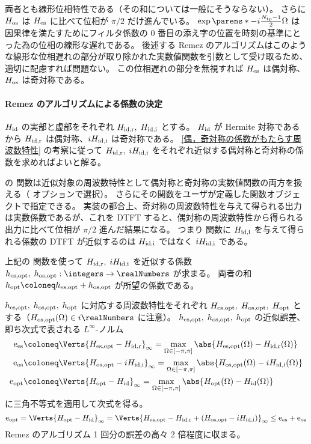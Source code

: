                 両者とも線形位相特性である（その和については一般にそうならない）。
                さらに $H_{\text{os}}$ は $H_{\text{es}}$ に比べて位相が $\pi/2$ だけ進んでいる。
                $\exp\parens*{-i\frac{\Ntp-1}{2}\Omega}$ は因果律を満たすためにフィルタ係数の 0 番目の添え字の位置を時刻の基準にとった為の位相の線形な遅れである。
                後述する Remez のアルゴリズムはこのような線形な位相遅れの部分が取り除かれた実数値関数を引数として受け取るため、適切に配慮すれば問題ない。
                この位相遅れの部分を無視すれば $H_{\text{es}}$ は偶対称、$H_{\text{os}}$ は奇対称である。
            \paragraph{Remez のアルゴリズムによる係数の決定}
                \label{Remez のアルゴリズムによる係数の決定}
                $H_{\text{id}}$ の実部と虚部をそれぞれ $H_{\text{id,r}},\;H_{\text{id,i}}$ とする。
                $H_{\text{id}}$ が Hermite 対称であるから $H_{\text{id,r}}$ は偶対称、$iH_{\text{id,i}}$ は奇対称である。
                \ref{偶，奇対称の係数がもたらす周波数特性} の考察に従って $H_{\text{id,r}},\;iH_{\text{id,i}}$ をそれぞれ近似する偶対称と奇対称の係数を求めればよいと解る。
                \par
                \cite{DSP_JL} の  関数は近似対象の周波数特性として偶対称と奇対称の実数値関数の両方を扱える（ オプションで選択）。
                さらにその関数をユーザが定義した関数オブジェクトで指定できる。
                実装の都合上、奇対称の周波数特性を与えて得られる出力は実数係数であるが、これを DTFT すると、偶対称の周波数特性から得られる出力に比べて位相が $\pi/2$ 進んだ結果になる。
                つまり  関数に $H_{\text{id,i}}$ を与えて得られる係数の DTFT が近似するのは $H_{\text{id,i}}$ ではなく $iH_{\text{id,i}}$ である。
                \par
                上記の  関数を使って $H_{\text{id,r}},\;iH_{\text{id,i}}$ を近似する係数 $\hesOpt,\;\hosOpt:\integers\to\realNumbers$ が求まる。
                両者の和 $\hopt \coloneq \hesOpt + \hosOpt$ が所望の係数である。
                \par
                $h_{\text{es,opt}},\;h_{\text{os,opt}},\;h_{\text{opt}}$ に対応する周波数特性をそれぞれ $H_{\text{es,opt}},\;H_{\text{os,opt}},\;H_{\text{opt}}$ とする（$\HosOpt(\Omega)\in i\realNumbers$ に注意）。
                $h_{\text{es,opt}},\;h_{\text{os,opt}},\;h_{\text{opt}}$ の近似誤差、即ち次式で表される $L^\infty$-ノルム
                \begin{align*}
                    \eEs &\coloneq \Verts{\HesOpt - \HidR}_\infty = \max_{\Omega\in[-\pi,\pi]}\abs{\HesOpt(\Omega) - \HidR(\Omega)} \\
                    \eOs &\coloneq \Verts{\HosOpt - i\HidI}_\infty = \max_{\Omega\in[-\pi,\pi]}\abs{\HosOpt(\Omega) - i\HidI(\Omega)} \\
                    \eOpt &\coloneq \Verts{\Hopt - \Hid}_\infty = \max_{\Omega\in[-\pi,\pi]}\abs{\Hopt(\Omega ) -\Hid(\Omega)}
                \end{align*}
                に三角不等式を適用して次式を得る。
                \[ \eOpt = \Verts{\Hopt - \Hid}_\infty = \Verts{\HesOpt - \HidR + (\HosOpt - i\HidI)}_\infty \leq \eEs + \eOs \]
                Remez のアルゴリズム 1 回分の誤差の高々 2 倍程度に収まる。
